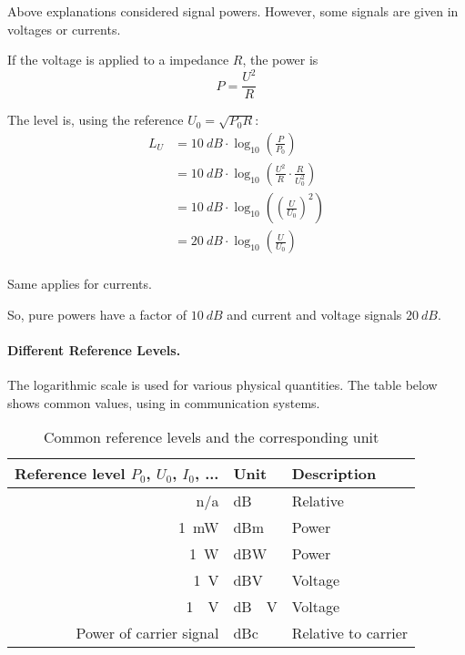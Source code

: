 \begin{refsection}
Above explanations considered signal powers. However, some signals are given in voltages or currents.

If the voltage is applied to a impedance $R$, the power is
\begin{equation}
	P = \frac{U^2}{R}
\end{equation}

The level is, using the reference $U_0 = \sqrt{P_0 R}$:
\begin{equation}
	\begin{split}
		L_U &= \SI{10}{dB} \cdot \log_{10} \left(\frac{P}{P_0}\right) \\
		 &= \SI{10}{dB} \cdot \log_{10} \left(\frac{U^2}{R} \cdot \frac{R}{U_0^2}\right) \\
		 &= \SI{10}{dB} \cdot \log_{10} \left(\left(\frac{U}{U_0}\right)^2\right) \\
		 &= \SI{20}{dB} \cdot \log_{10} \left(\frac{U}{U_0}\right) \\
	\end{split}
\end{equation}

Same applies for currents.

So, pure powers have a factor of $\SI{10}{dB}$ and current and voltage signals $\SI{20}{dB}$.

\paragraph{Different Reference Levels.}

The logarithmic scale is used for various physical quantities. The table below shows common values, using in communication systems.

\begin{table}[H]
	\centering
	\caption{Common reference levels and the corresponding unit}
	\begin{tabular}{|r|l|l|}
		\hline
		Reference level $P_0$, $U_0$, $I_0$, ... & Unit & Description \\
		\hline
		\hline
		n/a & \si{dB} & Relative \\
		\hline
		\SI{1}{mW} & \si{dBm} & Power \\
		\hline
		\SI{1}{W} & \si{dBW} & Power \\
		\hline
		\SI{1}{V} & \si{dBV} & Voltage \\
		\hline
		\SI{1}{\micro.V} & \si{dB\micro.V} & Voltage \\
		\hline
		Power of carrier signal & \si{dBc} & Relative to carrier \\
		\hline
	\end{tabular}
\end{table}


\end{refsection}
